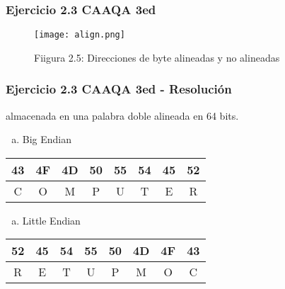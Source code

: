 \documentclass{beamer}
\begin{document}
\begin{frame}
 \frametitle{Ejercicio 2.3 CAAQA 3ed}
 \begin{center}
 \begin{figure}
 \texttt{[image: align.png]}
 \caption*{Fiigura 2.5: Direcciones de byte alineadas y no alineadas} %

 \end{figure}

\end{center}
 \end{frame}
 
\begin{frame}
 \frametitle{Ejercicio 2.3 CAAQA 3ed - Resolución}
 
   almacenada en una palabra doble alineada en 64 bits.

 \begin{enumerate}[a.]
  \item Big Endian
   \end{enumerate}

\begin{center}
  \begin{tabular}{| c | c | c | c | c | c | c | c | }
    \hline
    43 & 4F & 4D & 50 &55 & 54 & 45 & 52 \\ \hline
    C & O & M & P & U & T & E & R \\ \hline
  \end{tabular}
\end{center}

 \begin{enumerate}[b.]
  \item Little Endian
   \end{enumerate}
  
  \begin{center}
  \begin{tabular}{| c | c | c | c | c | c | c | c | }
    \hline
    52 & 45 & 54 & 55 & 50 & 4D & 4F & 43 \\ \hline
     R & E & T & U & P & M & O & C \\ \hline
  \end{tabular}
\end{center}
   
 \end{frame}
 
\end{document}
